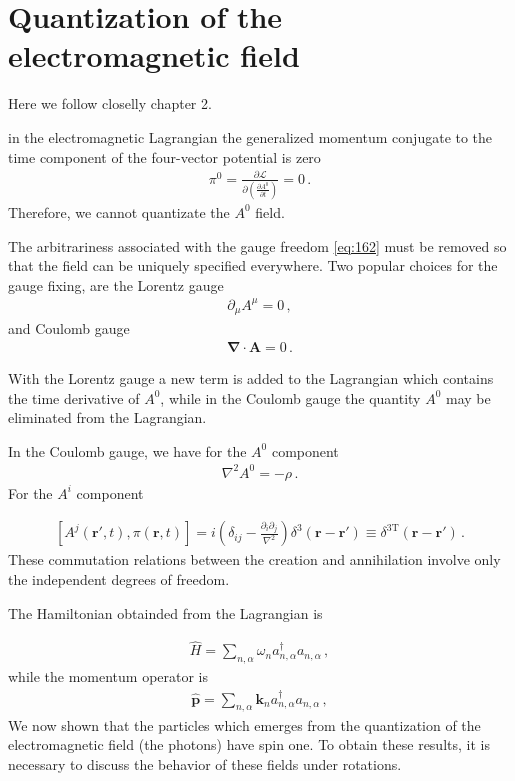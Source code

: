 \section{Quantization of the electromagnetic field}
Here we follow closelly \cite{Gross:1993} chapter 2.

in the electromagnetic Lagrangian the generalized momentum conjugate to the time component of the four-vector potential is zero
\begin{align}
  \pi^0=\frac{\partial\mathcal{L}}{\partial\left(\displaystyle{\frac{\partial A^0}{\partial t}}\right)}=0\,.
\end{align}
Therefore, we cannot quantizate the $A^0$ field.

The arbitrariness associated with the gauge freedom \eqref{eq:162} must be removed so that the field can be uniquely specified everywhere. Two popular choices for the gauge fixing, are the Lorentz gauge
\begin{align}
  \partial_\mu A^\mu=0\,,
\end{align}
and Coulomb gauge
\begin{align}
  \boldsymbol{\nabla}\cdot \mathbf{A}=0\,.
\end{align}

With the Lorentz gauge a new term is added to the Lagrangian which contains the time derivative of $A^0$, while in the Coulomb gauge the quantity $A^0$ may be eliminated from the Lagrangian.

In the Coulomb gauge, we have for the $A^0$ component
\begin{align}
  \nabla^2A^0=-\rho\,.
\end{align}
For the $A^i$ component

\begin{align}
  \left[A^j(\mathbf{r}',t),\pi(\mathbf{r},t)\right]=i\left(\delta_{ij}-\frac{\partial_i\partial_j}{\nabla^2}\right)\delta^3(\mathbf{r}-\mathbf{r}')
\equiv \delta^{3 \text{T}}(\mathbf{r}-\mathbf{r}')\,.
\end{align}
These commutation relations between the creation and annihilation involve only the independent degrees of freedom.

The Hamiltonian obtainded from the Lagrangian is

\begin{align}
  \widehat{H}=\sum_{n,\alpha}\omega_n a_{n,\alpha}^\dagger a_{n,\alpha}\,,
\end{align}
while the momentum operator is
\begin{align}
 \widehat{ \mathbf{p}}=\sum_{n,\alpha}\mathbf{k}_n a_{n,\alpha}^\dagger a_{n,\alpha}\,,
\end{align}
We now shown that the particles which emerges from the quantization of the electromagnetic field (the photons) have spin one. To obtain these results, it is necessary to discuss the behavior of these fields under rotations. 

